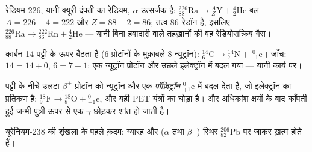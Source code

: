 \begin{example}[एक अल्फ़ा क्षय]\label{ex:g11:nucleus-radioactivity:alpha}
रेडियम-226, यानी क्यूरी दंपती का रेडियम, $\alpha$ उत्सर्जक है:
${}^{226}_{88}\mathrm{Ra} \to {}^{A}_{Z}\mathrm{Y} + {}^{4}_{2}\mathrm{He}$
बल $A = 226 - 4 = 222$ और $Z = 88 - 2 = 86$; तत्व $86$ रेडॉन है, इसलिए
${}^{226}_{88}\mathrm{Ra} \to {}^{222}_{86}\mathrm{Rn} + {}^{4}_{2}\mathrm{He}$
--- यानी बिना हवादारी वाले तहख़ानों की वह रेडियोसक्रिय गैस।
\end{example}

\begin{example}[एक बीटा-ऋण क्षय]\label{ex:g11:nucleus-radioactivity:beta}
कार्बन-14 पट्टी के ऊपर बैठता है ($6$ प्रोटॉनों के मुक़ाबले $8$
न्यूट्रॉन):
${}^{14}_{6}\mathrm{C} \to {}^{14}_{7}\mathrm{N} + {}^{\;0}_{-1}\mathrm{e}$।
जाँच: $14 = 14 + 0$, $6 = 7 - 1$; एक न्यूट्रॉन प्रोटॉन और उछले इलेक्ट्रॉन में बदल गया
--- यानी  कार्य पर।
\end{example}

\begin{remark}[बीटा-धन और गामा]\label{rem:g11:nucleus-radioactivity:betaplus}
पट्टी के नीचे उलटा  $\beta^+$ प्रोटॉन को न्यूट्रॉन और एक
\emph{पॉज़िट्रॉन} ${}^{0}_{+1}\mathrm{e}$ में बदल देता है, जो इलेक्ट्रॉन
का प्रतिकण है:
${}^{18}_{9}\mathrm{F} \to {}^{18}_{8}\mathrm{O} + {}^{0}_{+1}\mathrm{e}$,
और यही PET यंत्रों का घोड़ा है। और अधिकांश क्षयों के बाद काँपती हुई जन्मी
पुत्री ऊपर से एक $\gamma$ छोड़कर शांत हो जाती है।
\end{remark}

\begin{omfigure}

{\small यूरेनियम-238 की शृंखला के पहले क़दम; ग्यारह और  ($\alpha$ तथा
$\beta^-$) स्थिर ${}^{206}_{82}\mathrm{Pb}$ पर जाकर ख़त्म होते हैं।}
\end{omfigure}

